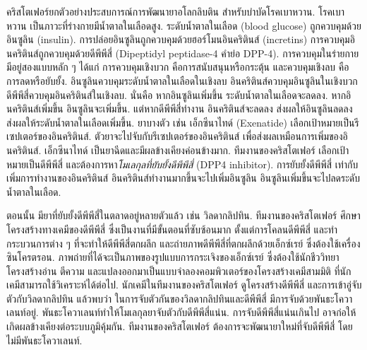 {\begin{shaded}

คริสโตเฟอร์ยกตัวอย่างประสบการณ์การพัฒนายาอโลกลิบติน สำหรับบำบัดโรคเบาหวาน.
โรคเบาหวาน เป็นภาวะที่ร่างกายมีน้ำตาลในเลือดสูง.
ระดับน้ำตาลในเลือด (blood glucose) ถูกควบคุมด้วยอินซูลิน (insulin).
การปล่อยอินซูลินถูกควบคุมด้วยฮอร์โมนอินคริตินส์ (incretins\cite{KimEgan2008})
การควบคุมอินคริตินส์ถูกควบคุมด้วยดีพีพีสี่ (Dipeptidyl peptidase-4 คำย่อ DPP-4).
การควบคุมในร่ายกายมีอยู่สองแบบหลัก ๆ ได้แก่ การควบคุมเชิงบวก คือการสนับสนุนหรือกระตุ้น และควบคุมเชิงลบ คือการลดหรือยับยั้ง.
อินซูลินควบคุมระดับน้ำตาลในเลือดในเชิงลบ
อินคริตินส์ควบคุมอินซูลินในเชิงบวก
ดีพีพีสี่ควบคุมอินคริตินส์ในเชิงลบ.
นั่นคือ หากอินซูลินเพิ่มขึ้น ระดับน้ำตาลในเลือดจะลดลง.
หากอินคริตินส์เพิ่มขึ้น อินซูลินจะเพิ่มขึ้น.
แต่หากดีพีพีสี่ทำงาน อินคริตินส์จะลดลง ส่งผลให้อินซูลินลดลง ส่งผลให้ระดับน้ำตาลในเลือดเพิ่มขึ้น.
ยาบางตัว เช่น เอ็กซีนาไทด์ (Exenatide) เลือกเป้าหมายเป็นรีเซปเตอร์ของอินคริตินส์.
ตัวยาจะไปจับกับรีเซปเตอร์ของอินคริตินส์ เพื่อส่งผลเหมือนการเพิ่มของอินคริตินส์.
เอ็กซีนาไทด์ เป็นยาฉีดและมีผลข้างเคียงค่อนข้างมาก.
ทีมงานของคริสโตเฟอร์ เลือกเป้าหมายเป็นดีพีพีสี่ และต้องการหา\textit{โมเลกุลที่ยับยั้งดีพีพีสี่} (DPP4 inhibitor).
การยับยั้งดีพีพีสี่ เท่ากับเพิ่มการทำงานของอินคริตินส์ อินคริตินส์ทำงานมากขึ้นจะไปเพิ่มอินซูลิน อินซูลินเพิ่มขึ้นจะไปลดระดับน้ำตาลในเลือด.

ตอนนั้น มียาที่ยับยั้งดีพีพีสี่ในตลาดอยู่หลายตัวแล้ว เช่น วิลดากลิปทิน.
ทีมงานของคริสโตเฟอร์
ศึกษาโครงสร้างทางเคมีของดีพีพีสี่ ซึ่งเป็นงานที่มีขั้นตอนที่ซับซ้อนมาก ตั้งแต่การโคลนดีพีพีสี่ และทำกระบวนการต่าง ๆ ที่จะทำให้ดีพีพีสี่ตกผลึก 
และถ่ายภาพดีพีพีสี่ที่ตกผลึกด้วยเอ็กซ์เรย์ ซึ่งต้องใช้เครื่องซินโครตรอน.
ภาพถ่ายที่ได้จะเป็นภาพของรูปแบบการกระเจิงของเอ็กซ์เรย์ 
ซึ่งต้องใช้นักชีววิทยาโครงสร้างอ่าน ตีความ และแปลงออกมาเป็นแบบจำลองคอมพิวเตอร์ของโครงสร้างเคมีสามมิติ ที่นักเคมีสามารถใช้วิเคราะห์ได้ต่อไป.
นักเคมีในทีมงานของคริสโตเฟอร์ ดูโครงสร้างดีพีพีสี่ และการเข้าอู่จับตัวกับวิลดากลิปทิน 
แล้วพบว่า ในการจับตัวกันของวิลดากลิปทินและดีพีพีสี่ มีการจับด้วยพันธะโควาเลนท์อยู่.
พันธะโควาเลนท์ทำให้โมเลกุลยาจับตัวกับดีพีพีสี่แน่น.
การจับดีพีพีสี่แน่นเกินไป อาจก่อให้เกิดผลข้างเคียงต่อระบบภูมิคุ้มกัน.
ทีมงานของคริสโตเฟอร์ ต้องการจะพัฒนายาใหม่ที่จับดีพีพีสี่ โดยไม่มีพันธะโควาเลนท์.


\end{shaded}}

